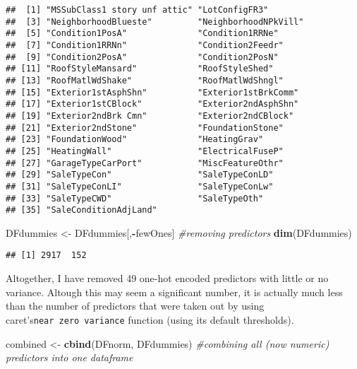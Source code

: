 \documentclass[]{article}
\newenvironment{Shaded}{\begin{snugshade}}{\end{snugshade}}
\newcommand{\KeywordTok}[1]{\textcolor[rgb]{0.13,0.29,0.53}{\textbf{#1}}}
\newcommand{\StringTok}[1]{\textcolor[rgb]{0.31,0.60,0.02}{#1}}
\newcommand{\CommentTok}[1]{\textcolor[rgb]{0.56,0.35,0.01}{\textit{#1}}}
\newcommand{\OperatorTok}[1]{\textcolor[rgb]{0.81,0.36,0.00}{\textbf{#1}}}
\newcommand{\NormalTok}[1]{#1}
\begin{document}
\begin{verbatim}
##  [1] "MSSubClass1 story unf attic" "LotConfigFR3"               
##  [3] "NeighborhoodBlueste"         "NeighborhoodNPkVill"        
##  [5] "Condition1PosA"              "Condition1RRNe"             
##  [7] "Condition1RRNn"              "Condition2Feedr"            
##  [9] "Condition2PosA"              "Condition2PosN"             
## [11] "RoofStyleMansard"            "RoofStyleShed"              
## [13] "RoofMatlWdShake"             "RoofMatlWdShngl"            
## [15] "Exterior1stAsphShn"          "Exterior1stBrkComm"         
## [17] "Exterior1stCBlock"           "Exterior2ndAsphShn"         
## [19] "Exterior2ndBrk Cmn"          "Exterior2ndCBlock"          
## [21] "Exterior2ndStone"            "FoundationStone"            
## [23] "FoundationWood"              "HeatingGrav"                
## [25] "HeatingWall"                 "ElectricalFuseP"            
## [27] "GarageTypeCarPort"           "MiscFeatureOthr"            
## [29] "SaleTypeCon"                 "SaleTypeConLD"              
## [31] "SaleTypeConLI"               "SaleTypeConLw"              
## [33] "SaleTypeCWD"                 "SaleTypeOth"                
## [35] "SaleConditionAdjLand"
\end{verbatim}

\begin{Shaded}
\begin{Highlighting}[]
\NormalTok{DFdummies <-}\StringTok{ }\NormalTok{DFdummies[,}\OperatorTok{-}\NormalTok{fewOnes] }\CommentTok{#removing predictors}
\KeywordTok{dim}\NormalTok{(DFdummies)}
\end{Highlighting}
\end{Shaded}

\begin{verbatim}
## [1] 2917  152
\end{verbatim}

Altogether, I have removed 49 one-hot encoded predictors with little or
no variance. Altough this may seem a significant number, it is actually
much less than the number of predictors that were taken out by using
caret's\texttt{near\ zero\ variance} function (using its default
thresholds).

\begin{Shaded}
\begin{Highlighting}[]
\NormalTok{combined <-}\StringTok{ }\KeywordTok{cbind}\NormalTok{(DFnorm, DFdummies) }\CommentTok{#combining all (now numeric) predictors into one dataframe }
\end{Highlighting}
\end{Shaded}
\end{document}
